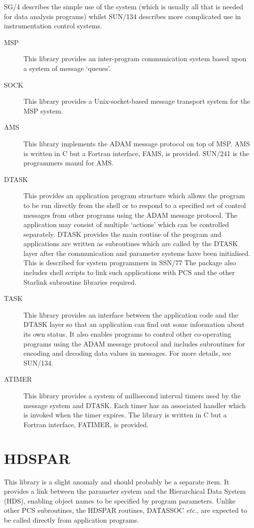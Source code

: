 \documentclass[twoside,11pt]{article}
\newcommand{\xref}[3]{#1}
\newcommand{\xlabel}[1]{}
\renewcommand{\_}{\texttt{\symbol{95}}}
\begin{document}
\xref{SG/4}{sg4}{}
describes the simple use of the system (which is usually all that is needed for
data analysis programs) whilst
\xref{SUN/134}{sun134}{}
describes more complicated use in instrumentation control systems.
\begin{description}
\item[MSP] This library provides an inter-program communication system based
upon a system of message `queues'.
\item[SOCK] This library provides a Unix-socket-based message transport system
for the MSP system.
\item[AMS] This library implements the ADAM message protocol on top of MSP.
AMS is written in C but a Fortran interface, FAMS, is provided.
\xref{SUN/241}{sun241}{}
is the programmers manul for AMS.
\item[DTASK] This provides an application program structure which allows the
program to be run directly from the shell or to respond to a specified set of
control messages from other programs using the ADAM message protocol.
The application may consist of multiple `actions' which can be controlled
separately.
DTASK provides the main routine of the program and applications are written
as subroutines which are called by the DTASK layer after the communication and
parameter systems have been initialised. This is described for system
programmers in
\xref{SSN/77}{ssn77}{}
The package also includes shell scripts to link such applications with PCS and
the other Starlink subroutine libraries required.
\item[TASK] This library provides an interface between the application code
and the DTASK layer so that an application can find out some information
about its own status. It also enables programs to control other co-operating
programs using the ADAM message protocol and includes subroutines for encoding
and decoding data values in messages.
For more details, see
\xref{SUN/134}{sun134}{}.
\item[ATIMER] This library provides a system of millisecond interval timers
used by the message system and DTASK.
Each timer has an associated handler which is invoked when the timer expires.
The library is written in C but a Fortran interface, FATIMER, is provided.
\end{description}

\section{\xlabel{hdspar}HDSPAR}
This library is a slight anomaly and should probably be a separate item.
It provides a link between the parameter system and the
\xref{Hierarchical Data System (HDS)}{sun92}{abstract},
enabling object names to be specified by program parameters.
Unlike other PCS subroutines, the HDSPAR routines, DAT\_ASSOC \textit{etc.}, are
expected to be called directly from application programs.
\end{document}
